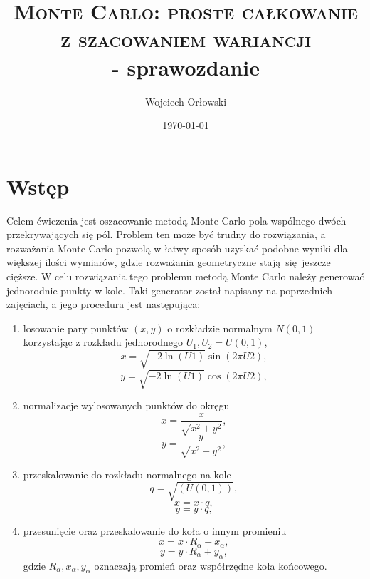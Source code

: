 \documentclass[a4paper, 12pt]{article}
\title{\textsc{Monte Carlo: proste całkowanie z szacowaniem wariancji}\\ - sprawozdanie}
\author{Wojciech Orłowski}
\date{\today}
\begin{document}
    \maketitle

    \section{Wstęp}
    
    Celem ćwiczenia jest oszacowanie metodą Monte Carlo pola wspólnego dwóch przekrywających się pól.
    Problem ten może być trudny do rozwiązania, a rozważania Monte Carlo pozwolą w łatwy sposób uzyskać podobne wyniki dla większej ilości wymiarów, gdzie rozważania geometryczne stają się jeszcze cięższe.
    W celu rozwiązania tego problemu metodą Monte Carlo należy generować jednorodnie punkty w kole.
    Taki generator został napisany na poprzednich zajęciach, a jego procedura jest następująca:
    \begin{enumerate}
        \item losowanie pary punktów $(x,y)$ o rozkładzie normalnym $N(0,1)$ korzystając z rozkładu jednorodnego $U_1,U_2 = U(0,1)$,
        \[ x = \sqrt{-2\ln(U1)}\sin(2\pi U2), \]
        \[ y = \sqrt{-2\ln(U1)}\cos(2\pi U2), \] 
        \item normalizacje wylosowanych punktów do okręgu
        \[ x = \frac{x}{\sqrt{x^2 + y^2}}, \] 
        \[ y = \frac{y}{\sqrt{x^2 + y^2}}, \] 
        \item przeskalowanie do rozkładu normalnego na kole
        \[ q = \sqrt{(U(0,1))}, \]
        \[ x = x \cdot q, \]
        \[ y = y \cdot q, \]
        \item przesunięcie oraz przeskalowanie do koła o innym promieniu
        \[ x = x \cdot R_\alpha + x_\alpha, \]
        \[ y = y \cdot R_\alpha + y_\alpha, \]
        gdzie $R_\alpha, x_\alpha, y_\alpha$ oznaczają promień oraz współrzędne koła końcowego.
    \end{enumerate}
\end{document}
